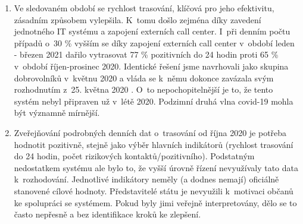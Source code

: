 \begin{enumerate}
\item Ve sledovaném období se rychlost trasování, klíčová pro jeho efektivitu, zásadním způsobem vylepšila. K~tomu došlo zejména díky zavedení jednotného IT systému a zapojení externích call center. I~při denním počtu případů o~30 \% vyšším se díky zapojení externích call center v~období leden - březen 2021 dařilo vytrasovat 77 \% pozitivních do 24 hodin proti 65 \% v~období říjen-prosinec 2020. Identické řešení jsme navrhovali jako skupina dobrovolníků v~květnu 2020 \cite{tr_hlidac02} a vláda se k~němu dokonce zavázala svým rozhodnutím z~25. května 2020 \cite{tr_vlada01}. O~to nepochopitelnější je to, že tento systém nebyl připraven už v~létě 2020. Podzimní druhá vlna covid-19 mohla být významně mírnější.
\item Zveřejňování podrobných denních dat o~trasování od října 2020 je potřeba hodnotit pozitivně, stejně jako výběr hlavních indikátorů (rychlost trasování do 24 hodin, počet rizikových kontaktů/pozitivního). Podstatným nedostatkem systému ale bylo to, že vyšší úrovně řízení nevyužívaly tato data k~rozhodování. Jednotlivé indikátory neměly (a dodnes nemají) oficiálně stanovené cílové hodnoty. Představitelé státu je nevyužili k~motivaci občanů ke spolupráci se systémem. Pokud byly jimi veřejně interpretovány, dělo se to často nepřesně a bez identifikace kroků ke zlepšení.


\end{enumerate}
